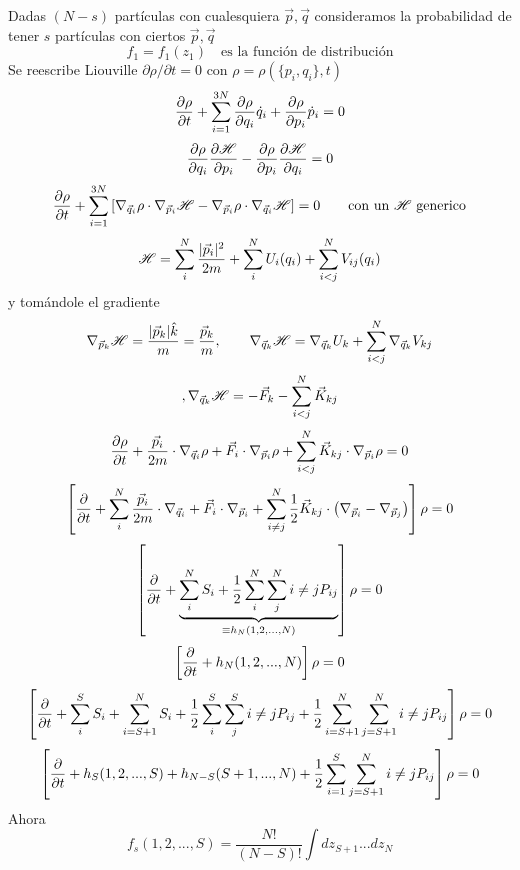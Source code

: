 \documentclass[10pt,oneside]{CBFT_book}
\begin{document}
Dadas $(N-s)$ partículas con cualesquiera $\vec{p},\vec{q}$ consideramos la probabilidad de tener $s$
partículas con ciertos  $\vec{p},\vec{q}$
\[
	f_1 = f_1(z_1) \quad \text{es la función de distribución}
\]
Se reescribe Liouville $\partial{\rho}/\partial {t} = 0$ con $\rho = \rho( \{ p_i, q_i\},t )$
\[
	\frac{\partial^{\hspace{-0.05em}} {\rho}}{\partial {t}^{\hspace{-0.05em}}} +  \sum_{i=1}^{3N} \frac{\partial^{\hspace{-0.05em}} {\rho}}{\partial {q_i}^{\hspace{-0.05em}}} \dot{q}_i + \frac{\partial^{\hspace{-0.05em}} {\rho}}{\partial {p_i}^{\hspace{-0.05em}}} \dot{p}_i = 0
\]
\[
	\frac{\partial^{\hspace{-0.05em}} {\rho}}{\partial {q_i}^{\hspace{-0.05em}}} \frac{\partial^{\hspace{-0.05em}} {\mathscr{H}}}{\partial {p_i}^{\hspace{-0.05em}}} - \frac{\partial^{\hspace{-0.05em}} {\rho}}{\partial {p_i}^{\hspace{-0.05em}}} \frac{\partial^{\hspace{-0.05em}} {\mathscr{H}}}{\partial {q_i}^{\hspace{-0.05em}}} = 0
\]
\[
	\frac{\partial^{\hspace{-0.05em}} {\rho}}{\partial {t}^{\hspace{-0.05em}}} + \sum_{i=1}^{3N} \left[ \nabla_{\vec{q}_i}\rho \cdot \nabla_{\vec{p}_i}\mathscr{H} -
	\nabla_{\vec{p}_i}\rho \cdot \nabla_{\vec{q}_i}\mathscr{H} \right] = 0 \qquad \text{con un $\mathscr{H}$ generico}
\]
\[
	\mathscr{H} = \sum_i^N \frac{|\vec{p}_i|^2}{2m} + \sum_i^N U_i(q_i)+ \sum_{i<j}^N V_{ij}(q_i)
\]
y tomándole el gradiente
\[
	\nabla_{\vec{p}_k}\mathscr{H} = \frac{|\vec{p}_k|\hat{k}}{m} = \frac{\vec{p}_k}{m},\qquad
	\nabla_{\vec{q}_k}\mathscr{H} = \nabla_{\vec{q}_k}U_k + \sum_{i<j}^N \nabla_{\vec{q}_k} V_{kj}
\]
\[
				, \nabla_{\vec{q}_k}\mathscr{H} = -\vec{F}_k - \sum_{i<j}^N \vec{K}_{kj}
\]
\[
	\frac{\partial^{\hspace{-0.05em}} {\rho}}{\partial {t}^{\hspace{-0.05em}}} + \frac{\vec{p}_i}{2m} \cdot \nabla_{\vec{q}_i}\rho + \vec{F}_i \cdot \nabla_{\vec{p}_i}\rho + 
	\sum_{i<j}^N \vec{K}_{kj}\cdot \nabla_{\vec{p}_i} \rho = 0
\]
\[
	\left[ \frac{\partial^{\hspace{-0.05em}} {}}{\partial {t}^{\hspace{-0.05em}}} + \sum_i^N \frac{\vec{p}_i}{2m} \cdot \nabla_{\vec{q}_i} + 
	\vec{F}_i \cdot \nabla_{\vec{p}_i} + \sum_{i\neq j}^N \frac{1}{2}\vec{K}_{kj}\cdot \left( \nabla_{\vec{p}_i} -
	\nabla_{\vec{p}_j} \right) \right] \rho = 0
\]
\[
	\left[ \frac{\partial^{\hspace{-0.05em}} {}}{\partial {t}^{\hspace{-0.05em}}} + \underbrace{\sum_i^N S_i + \frac{1}{2} \sum_i^N\sum_j^N {i\neq j} P_{ij}}_{\equiv
	h_N(1,2,...,N)} \right] \rho = 0
\]
\[
	\left[ \frac{\partial^{\hspace{-0.05em}} {}}{\partial {t}^{\hspace{-0.05em}}} + h_N(1,2,...,N) \right] \rho = 0
\]
\[
	\left[ 
	\frac{\partial^{\hspace{-0.05em}} {}}{\partial {t}^{\hspace{-0.05em}}} + \sum_i^S S_i + \sum_{i=S+1}^N S_i + \frac{1}{2} \sum_i^S\sum_j^S {i\neq j} P_{ij} 
	+ \frac{1}{2} \sum_{i=S+1}^N\sum_{j=S+1}^N {i\neq j} P_{ij}
	\right] \rho = 0
\]
\[
	\left[ 
	\frac{\partial^{\hspace{-0.05em}} {}}{\partial {t}^{\hspace{-0.05em}}} + h_S(1,2,...,S)  + h_{N-S}(S+1,...,N)  + \frac{1}{2} \sum_{i=1}^S\sum_{j=S+1}^N {i\neq j} P_{ij}
	\right] \rho = 0
\]
Ahora
\[
	f_s(1,2,...,S) = \frac{N!}{(N-S)!} \int dz_{S+1} ... dz_N
\]

\end{document}
